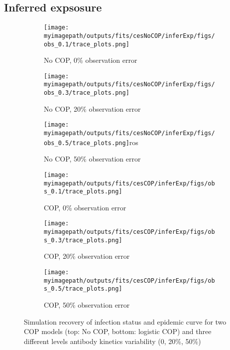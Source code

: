 \subsection{Inferred expsosure}
\begin{figure}[H]
    \centering
    \begin{subfigure}{0.31\textwidth}
        \centering
        \texttt{[image: \\myimagepath/outputs/fits/cesNoCOP/inferExp/figs/obs\_0.1/trace\_plots.png]}
        \caption{No COP, 0\% observation error}
    \end{subfigure}
    \begin{subfigure}{0.31\textwidth}
        \centering
        \texttt{[image: \\myimagepath/outputs/fits/cesNoCOP/inferExp/figs/obs\_0.3/trace\_plots.png]}
        \caption{No COP, 20\% observation error}
    \end{subfigure}
    \begin{subfigure}{0.31\textwidth}
        \centering
        \texttt{[image: \\myimagepath/outputs/fits/cesNoCOP/inferExp/figs/obs\_0.5/trace\_plots.png]}ros        \caption{No COP, 50\% observation error}
    \end{subfigure}
    
  \begin{subfigure}{0.31\textwidth}
        \centering
        \texttt{[image: \\myimagepath/outputs/fits/cesCOP/inferExp/figs/obs\_0.1/trace\_plots.png]}
        \caption{ COP, 0\% observation error}
    \end{subfigure}
    \begin{subfigure}{0.31\textwidth}
        \centering
        \texttt{[image: \\myimagepath/outputs/fits/cesCOP/inferExp/figs/obs\_0.3/trace\_plots.png]}
        \caption{ COP, 20\% observation error}
    \end{subfigure}
    \begin{subfigure}{0.31\textwidth}
        \centering
        \texttt{[image: \\myimagepath/outputs/fits/cesCOP/inferExp/figs/obs\_0.5/trace\_plots.png]}
        \caption{ COP, 50\% observation error}
    \end{subfigure}
    
    \caption{Simulation recovery of infection status and epidemic curve for two COP models (top: No COP, bottom: logistic COP) and three different levels antibody kinetics variability (0, 20\%, 50\%)}
\end{figure}
